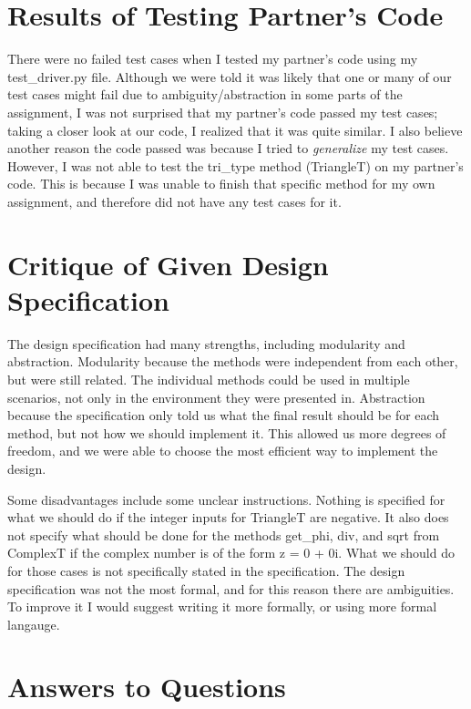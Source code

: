 \documentclass[12pt]{article}
\begin{document}
\section{Results of Testing Partner's Code}

There were no failed test cases when I tested my partner's code using my test\_driver.py file. Although we were told it was likely that one or many of our test cases might fail due to ambiguity/abstraction in some parts of the assignment, I was not surprised that my partner's code passed my test cases; taking a closer look at our code, I realized that it was quite similar. I also believe another reason the code passed was because I tried to \emph{generalize} my test cases. However, I was not able to test the tri\_type method (TriangleT) on my partner's code. This is because I was unable to finish that specific method for my own assignment, and therefore did not have any test cases for it. 

\section{Critique of Given Design Specification}

The design specification had many strengths, including modularity and abstraction. Modularity because the methods were independent from each other, but were still related. The individual methods could be used in multiple scenarios, not only in the environment they were presented in. Abstraction because the specification only told us what the final result should be for each method, but not how we should implement it. This allowed us more degrees of freedom, and we were able to choose the most efficient way to implement the design.

Some disadvantages include some unclear instructions. Nothing is specified for what we should do if the integer inputs for TriangleT are negative. It also does not specify what should be done for the methods get\_phi, div, and sqrt from ComplexT if the complex number is of the form z = 0 + 0i. What we should do for those cases is not specifically stated in the specification. The design specification was not the most formal, and for this reason there are ambiguities. To improve it I would suggest writing it more formally, or using more formal langauge.

\section{Answers to Questions}
\end{document}
